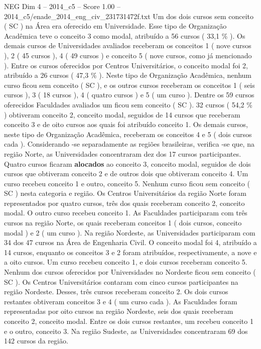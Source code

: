\begin{textsample}{NEG Dim 4 – 2014\_c5 – Score 1.00 – 2014\_c5/enade\_2014\_eng\_civ\_231731472f.txt}
Um dos dois cursos sem conceito ( SC ) na Área era oferecido em Universidade.
Esse tipo de Organização Acadêmica teve o conceito 3 como modal, atribuído a 56 cursos ( 33,1 \% ).
Os demais cursos de Universidades avaliados receberam os conceitos 1 ( nove cursos ), 2 ( 45 cursos ), 4 ( 49 cursos ) e conceito 5 ( nove cursos, como já mencionado ).
Entre os cursos oferecidos por Centros Universitários, o conceito modal foi 2, atribuído a 26 cursos ( 47,3 \% ).
Neste tipo de Organização Acadêmica, nenhum curso ficou sem conceito ( SC ), e os outros cursos receberam os conceitos 1 ( seis cursos ), 3 ( 18 cursos ), 4 ( quatro cursos ) e 5 ( um curso ).
Dentre os 59 cursos oferecidos Faculdades avaliados um ficou sem conceito ( SC ). 32 cursos ( 54,2 \% ) obtiveram conceito 2, conceito modal, seguidos de 14 cursos que receberam conceito 3 e de oito cursos aos quais foi atribuído conceito 1.
Os demais cursos, neste tipo de Organização Acadêmica, receberam os conceitos 4 e 5 ( dois cursos cada ).
Considerando -se separadamente as regiões brasileiras, verifica -se que, na região Norte, as Universidades concentraram dez dos 17 cursos participantes.
Quatro cursos ficaram \textbf{alocados} ao conceito 3, conceito modal, seguidos de dois cursos que obtiveram conceito 2 e de outros dois que obtiveram conceito 4.
Um curso recebeu conceito 1 e outro, conceito 5.
Nenhum curso ficou sem conceito ( SC ) nesta categoria e região.
Os Centros Universitários da região Norte foram representados por quatro cursos, três dos quais receberam conceito 2, conceito modal.
O outro curso recebeu conceito 1.
As Faculdades participaram com três cursos na região Norte, os quais receberam conceitos 1 ( dois cursos, conceito modal ) e 2 ( um curso ).
Na região Nordeste, as Universidades participaram com 34 dos 47 cursos na Área de Engenharia Civil.
O conceito modal foi 4, atribuído a 14 cursos, enquanto os conceitos 3 e 2 foram atribuídos, respectivamente, a nove e a oito cursos.
Um curso recebeu conceito 1, e dois cursos receberam conceito 5.
Nenhum dos cursos oferecidos por Universidades no Nordeste ficou sem conceito ( SC ).
Os Centros Universitários contaram com cinco cursos participantes na região Nordeste.
Desses, três cursos receberam conceito 2.
Os dois cursos restantes obtiveram conceitos 3 e 4 ( um curso cada ).
As Faculdades foram representadas por oito cursos na região Nordeste, seis dos quais receberam conceito 2, conceito modal.
Entre os dois cursos restantes, um recebeu conceito 1 e o outro, conceito 3.
Na região Sudeste, as Universidades concentraram 69 dos 142 cursos da região.

\end{textsample}

